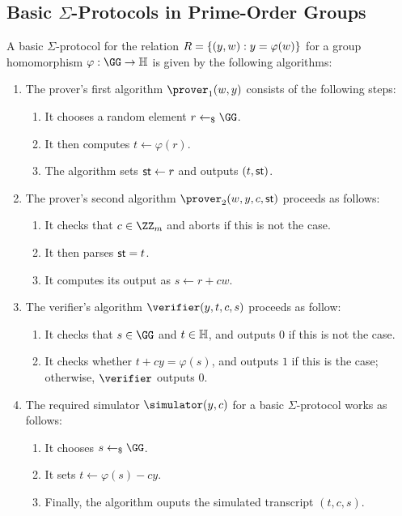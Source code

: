 \documentclass[runningheads]{llncs}
\begin{document}
\subsection{Basic $\Sigma$-Protocols in Prime-Order Groups}
A basic $\Sigma$-protocol for the relation $R=\{(y,w) : y=\varphi(w)\}$ for a group homomorphism $\varphi:\GG\to\HH$ is given by the following algorithms:

\begin{enumerate}
  \item
    The prover's first algorithm $\prover_1(w,y)$ consists of the following steps:
    \begin{enumerate}
      \item
        It chooses a random element $r\getsr\GG$.
      \item
        It then computes $t\gets\varphi(r)$.
      \item
	The algorithm sets $\mathsf{st}\gets r$ and outputs $(t,\mathsf{st})$.
    \end{enumerate}
  \item
    The prover's second algorithm $\prover_2(w,y,c,\st)$ proceeds as follows:
    \begin{enumerate}
      \item
        It checks that $c\in\ZZ_m$ and aborts if this is not the case.
      \item
	It then parses $\mathsf{st}=t$.
      \item
        It computes its output as $s\gets r+cw$.
    \end{enumerate}
  \item
    The verifier's algorithm $\verifier(y,t,c,s)$ proceeds as follow:
    \begin{enumerate}
      \item
        It checks that $s\in\GG$ and $t\in\mathbb{H}$, and outputs $0$ if this is not the case.
      \item
	It checks whether $t + cy = \varphi(s)$, and outputs $1$ if this is the case; otherwise, $\verifier$ outputs $0$.
    \end{enumerate}
  \item
    The required simulator $\simulator(y,c)$ for a basic $\Sigma$-protocol works as follows:
    \begin{enumerate}
      \item
        It chooses $s\getsr\GG$.
      \item
        It sets $t \gets \varphi(s) - cy$.
      \item
        Finally, the algorithm ouputs the simulated transcript $(t,c,s)$.
    \end{enumerate}
\end{enumerate}
\end{document}
